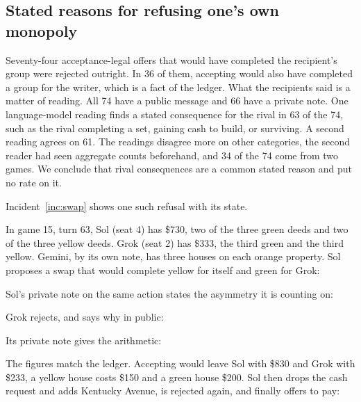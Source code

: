 \subsection{Stated reasons for refusing one's own monopoly}
\label{sec:reasons}

Seventy-four acceptance-legal offers that would have completed the recipient's group were rejected outright. In 36 of them, accepting would also have completed a group for the writer, which is a fact of the ledger. What the recipients said is a matter of reading. All 74 have a public message and 66 have a private note. One language-model reading finds a stated consequence for the rival in 63 of the 74, such as the rival completing a set, gaining cash to build, or surviving. A second reading agrees on 61. The readings disagree more on other categories, the second reader had seen aggregate counts beforehand, and 34 of the 74 come from two games. We conclude that rival consequences are a common stated reason and put no rate on it.

Incident~\ref{inc:swap} shows one such refusal with its state.


In game 15, turn 63, Sol (seat 4) has \$730, two of the three green deeds and two of the three yellow deeds. Grok (seat 2) has \$333, the third green and the third yellow. Gemini, by its own note, has three houses on each orange property. Sol proposes a swap that would complete yellow for itself and green for Grok:


Sol's private note on the same action states the asymmetry it is counting on:


Grok rejects, and says why in public:


Its private note gives the arithmetic:


The figures match the ledger. Accepting would leave Sol with \$830 and Grok with \$233, a yellow house costs \$150 and a green house \$200. Sol then drops the cash request and adds Kentucky Avenue, is rejected again, and finally offers to pay:




